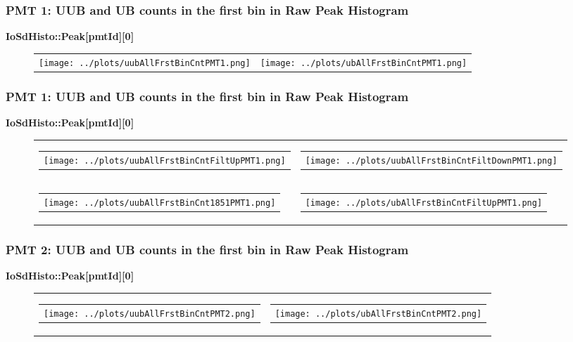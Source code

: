 \documentclass[aspectratio=169]{beamer}
\begin{document}

\begin{frame}
	\frametitle{PMT 1: UUB and UB counts in the first bin in Raw Peak Histogram}
	{\bf IoSdHisto::Peak[pmtId][0]}
	\begin{figure}
		\centering
		\begin{tabularx}{\textwidth}{CC}
				\texttt{[image: ../plots/uubAllFrstBinCntPMT1.png]}
			&
				\texttt{[image: ../plots/ubAllFrstBinCntPMT1.png]}
		\end{tabularx}
	\end{figure}
\end{frame}


\begin{frame}
	\frametitle{PMT 1: UUB and UB counts in the first bin in Raw Peak Histogram}
	{\bf IoSdHisto::Peak[pmtId][0]}
	\begin{figure}
		\centering
		\begin{tabularx}{\textwidth}{CC}
			\begin{tabular}{l}
				\texttt{[image: ../plots/uubAllFrstBinCntFiltUpPMT1.png]}
			\end{tabular}
			&
			\begin{tabular}{l}
				\texttt{[image: ../plots/uubAllFrstBinCntFiltDownPMT1.png]}
			\end{tabular}
			\\
			\begin{tabular}{l}
				\texttt{[image: ../plots/uubAllFrstBinCnt1851PMT1.png]}
			\end{tabular}
      & 
      \begin{tabular}{l}
        \texttt{[image: ../plots/ubAllFrstBinCntFiltUpPMT1.png]}
      \end{tabular}
		\end{tabularx}
	\end{figure}
\end{frame}


\begin{frame}
	\frametitle{PMT 2: UUB and UB counts in the first bin in Raw Peak Histogram}
	{\bf IoSdHisto::Peak[pmtId][0]}
	\begin{figure}
		\centering
		\begin{tabularx}{\textwidth}{CC}
			\begin{tabular}{l}
				\texttt{[image: ../plots/uubAllFrstBinCntPMT2.png]}
			\end{tabular}
			&
			\begin{tabular}{l}
				\texttt{[image: ../plots/ubAllFrstBinCntPMT2.png]}
			\end{tabular}
		\end{tabularx}
	\end{figure}
\end{frame}
\end{document}
